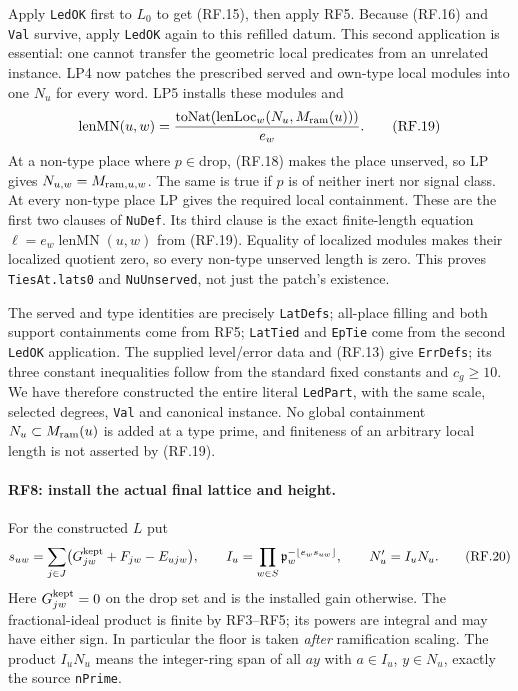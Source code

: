 \documentclass[11pt,a4paper]{article}
\numberwithin{equation}{section}
\theoremstyle{remark}\newtheorem{remark}[theorem]{Remark}
\begin{document}
Apply \texttt{LedOK} first to $L_0$ to get (RF.15), then apply RF5.
Because (RF.16) and \texttt{Val} survive, apply \texttt{LedOK} again to
this refilled datum. This second application is essential: one cannot
transfer the geometric local predicates from an unrelated instance.
LP4 now patches the prescribed served and own-type local modules into
one $N_u$ for every word. LP5 installs these modules and
\[
 \operatorname{lenMN}(u,w)
       =\frac{\operatorname{toNat}(\operatorname{lenLoc}_w
                          (N_u,M_{\rm ram}(u)))}{e_w}.          \tag{RF.19}
\]
At a non-type place where $p\in\mathrm{drop}$, (RF.18) makes the place
unserved, so LP gives $N_{u,w}=M_{{\rm ram},u,w}$. The same is true
if $p$ is of neither inert nor signal class. At every non-type place
LP gives the required local containment. These are the first two clauses
of \texttt{NuDef}. Its third clause is the exact finite-length equation
$\ell=e_w\operatorname{lenMN}(u,w)$ from (RF.19).
Equality of localized modules makes their localized quotient zero, so
every non-type unserved length is zero. This proves \texttt{TiesAt.lats0}
and \texttt{NuUnserved}, not just the patch's existence.

The served and type identities are precisely \texttt{LatDefs}; all-place
filling and both support containments come from RF5; \texttt{LatTied} and
\texttt{EpTie} come from the second \texttt{LedOK} application. The
supplied level/error data and (RF.13) give \texttt{ErrDefs}; its three
constant inequalities follow from the standard fixed constants and
$c_g\geq10$. We have therefore constructed the entire literal
\texttt{LedPart}, with the same scale, selected degrees, \texttt{Val}
and canonical instance. No global containment $N_u\subset M_{\rm ram}(u)$
is added at a type prime, and finiteness of an arbitrary local length is
not asserted by (RF.19).

\paragraph{RF8: install the actual final lattice and height.}
For the constructed $L$ put
\[
 s_{uw}=\sum_{j\in J}\bigl(G^{\rm kept}_{jw}+F_{jw}-E_{ujw}\bigr),
 \qquad
 I_u=\prod_{w\in S}\mathfrak p_w^{-\lfloor e_ws_{uw}\rfloor},
 \qquad N'_u=I_uN_u.                                         \tag{RF.20}
\]
Here $G^{\rm kept}_{jw}=0$ on the drop set and is the installed gain
otherwise. The fractional-ideal product is finite by RF3--RF5; its powers
are integral and may have either sign. In particular the floor is taken
\emph{after} ramification scaling. The product $I_uN_u$ means the integer-ring
span of all $ay$ with $a\in I_u$, $y\in N_u$, exactly the source
\texttt{nPrime}.
\end{document}
